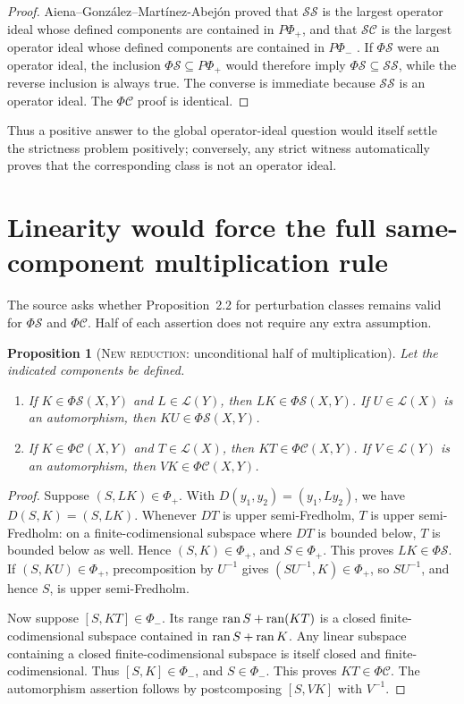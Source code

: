 \documentclass[11pt]{article}
\newtheorem{proposition}[theorem]{Proposition}
\theoremstyle{definition}
\newcommand{\Lop}{\mathcal L}
\newcommand{\SSing}{\mathcal{SS}}
\newcommand{\SCos}{\mathcal{SC}}
\newcommand{\PhiS}{\Phi\mathcal S}
\newcommand{\PhiC}{\Phi\mathcal C}
\newcommand{\PhiP}{\Phi_+}
\newcommand{\PhiM}{\Phi_-}
\newcommand{\PPhiP}{P\Phi_+}
\newcommand{\PPhiM}{P\Phi_-}
\newcommand{\ran}{\mathop{\rm ran}}
\newcommand{\newresult}{\textcolor{newblue}{\textsc{New reduction}}}
\begin{document}
\begin{proof}
Aiena--Gonz\'alez--Mart\'inez-Abej\'on proved that \(\SSing\) is the largest operator
ideal whose defined components are contained in \(\PPhiP\), and that \(\SCos\) is the
largest operator ideal whose defined components are contained in \(\PPhiM\)
\cite[Propositions~3.5 and 3.8]{Aiena2012}.  If \(\PhiS\) were an operator ideal, the
inclusion \(\PhiS\subseteq\PPhiP\) would therefore imply
\(\PhiS\subseteq\SSing\), while the reverse inclusion is always true.  The converse is
immediate because \(\SSing\) is an operator ideal.  The \(\PhiC\) proof is identical.
\end{proof}

Thus a positive answer to the global operator-ideal question would itself settle the
strictness problem positively; conversely, any strict witness automatically proves that the
corresponding class is not an operator ideal.

\section{Linearity would force the full same-component multiplication rule}

The source asks whether Proposition~2.2 for perturbation classes remains valid for
\(\PhiS\) and \(\PhiC\).  Half of each assertion does not require any extra assumption.

\begin{proposition}[\newresult: unconditional half of multiplication]\label{prop:mult}
Let the indicated components be defined.
\begin{enumerate}[label=\rm(\roman*)]
\item If \(K\in\PhiS(X,Y)\) and \(L\in\Lop(Y)\), then \(LK\in\PhiS(X,Y)\).
If \(U\in\Lop(X)\) is an automorphism, then \(KU\in\PhiS(X,Y)\).
\item If \(K\in\PhiC(X,Y)\) and \(T\in\Lop(X)\), then \(KT\in\PhiC(X,Y)\).
If \(V\in\Lop(Y)\) is an automorphism, then \(VK\in\PhiC(X,Y)\).
\end{enumerate}
\end{proposition}

\begin{proof}
Suppose \((S,LK)\in\PhiP\).  With
\(D(y_1,y_2)=(y_1,Ly_2)\), we have \(D(S,K)=(S,LK)\).  Whenever \(DT\) is upper
semi-Fredholm, \(T\) is upper semi-Fredholm: on a finite-codimensional subspace where
\(DT\) is bounded below, \(T\) is bounded below as well.  Hence \((S,K)\in\PhiP\), and
\(S\in\PhiP\).  This proves \(LK\in\PhiS\).  If \((S,KU)\in\PhiP\), precomposition
by \(U^{-1}\) gives \((SU^{-1},K)\in\PhiP\), so \(SU^{-1}\), and hence \(S\), is
upper semi-Fredholm.

Now suppose \([S,KT]\in\PhiM\).  Its range
\(\ran S+\ran(KT)\) is a closed finite-codimensional subspace contained in
\(\ran S+\ran K\).  Any linear subspace containing a closed finite-codimensional
subspace is itself closed and finite-codimensional.  Thus \([S,K]\in\PhiM\), and
\(S\in\PhiM\).  This proves \(KT\in\PhiC\).  The automorphism assertion follows by
postcomposing \([S,VK]\) with \(V^{-1}\).
\end{proof}
\end{document}
